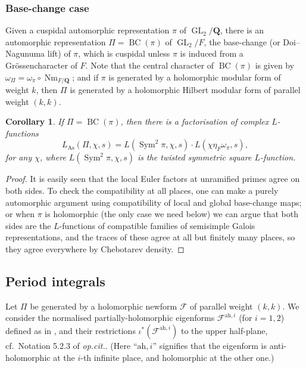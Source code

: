 \documentclass[a4paper,10pt]{amsart}
\theoremstyle{plain}
\newtheorem{corollary}[theorem]{Corollary}
\theoremstyle{remark}
\newcommand{\ah}{\mathrm{ah}}
\DeclareMathOperator{\GL}{GL}
\DeclareMathOperator{\Sym}{Sym}
\DeclareMathOperator{\Nm}{Nm}
\DeclareMathOperator{\BC}{BC}
\DeclareMathOperator{\As}{As}
\newcommand{\QQ}{\mathbf{Q}}
\newcommand{\cF}{\mathcal{F}}
\numberwithin{equation}{section}
\begin{document}
  \subsubsection*{Base-change case}

   Given a cuspidal automorphic representation $\pi$ of $\GL_2 / \QQ$, there is an automorphic representation $\Pi = \BC(\pi)$ of $\GL_2 / F$, the base-change (or Doi--Nagunuma lift) of $\pi$, which is cuspidal unless $\pi$ is induced from a Gr\"ossencharacter of $F$. Note that the central character of $\BC(\pi)$ is given by $\omega_{\Pi} = \omega_\pi \circ \Nm_{F / \QQ}$; and if $\pi$ is generated by a holomorphic modular form of weight $k$, then $\Pi$ is generated by a holomorphic Hilbert modular form of parallel weight $(k, k)$.

   \begin{corollary}\label{cor:factorisation}
    If $\Pi = \operatorname{BC}(\pi)$, then there is a factorisation of complex $L$-functions
    \[ L_{\As}(\Pi, \chi, s) = L(\Sym^2 \pi, \chi, s) \cdot L(\chi \eta_F \omega_{\pi}, s), \]
    for any $\chi$, where $L(\Sym^2 \pi, \chi, s)$ is the twisted symmetric square $L$-function.
   \end{corollary}

   \begin{proof}
    It is easily seen that the local Euler factors at unramified primes agree on both sides. To check the compatibility at all places, one can make a purely automorphic argument using compatibility of local and global base-change maps; or when $\pi$ is holomorphic (the only case we need below) we can argue that both sides are the $L$-functions of compatible families of semisimple Galois representations, and the traces of these agree at all but finitely many places, so they agree everywhere by Chebotarev density.
   \end{proof}


 \subsection{Period integrals}

  Let $\Pi$ be generated by a holomorphic newform $\cF$ of parallel weight $(k, k)$. We consider the normalised partially-holomorphic eigenforms $\cF^{\ah, i}$ (for $i = 1, 2$) defined as in \cite[Lemma 5.2.1]{leiloefflerzerbes18}, and their restrictions $\iota^*(\cF^{\ah, i})$ to the upper half-plane, cf.~Notation 5.2.3 of \emph{op.cit.}. (Here ``$\ah, i$'' signifies that the eigenform is anti-holomorphic at the $i$-th infinite place, and holomorphic at the other one.)
\end{document}
